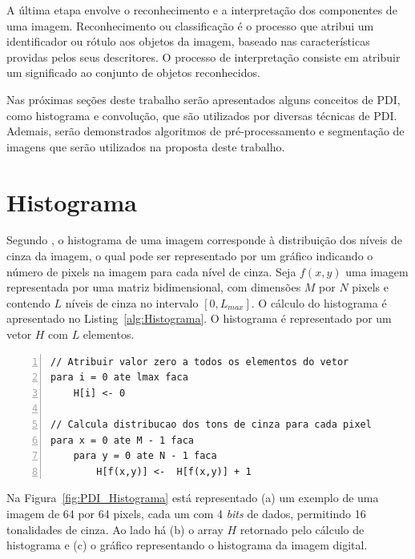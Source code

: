 \documentclass[12pt,oneside,a4paper,english,french,spanish,brazil,]{abntex2}
\begin{document}
A última etapa envolve o reconhecimento e a interpretação dos componentes de uma imagem. Reconhecimento ou classificação é o processo que atribui um identificador ou rótulo aos objetos da imagem, baseado nas características providas pelos seus descritores. O processo de interpretação consiste em atribuir um significado ao conjunto de objetos reconhecidos.

Nas próximas seções deste trabalho serão apresentados alguns conceitos de PDI, como histograma e convolução, que são utilizados por diversas técnicas de PDI. Ademais, serão demonstrados algoritmos de pré-processamento e segmentação de imagens que serão utilizados na proposta deste trabalho.

\section{Histograma}

Segundo \citet{pedrini:2008}, o histograma de uma imagem corresponde à distribuição dos níveis de cinza da imagem, o qual pode ser representado por um gráfico indicando o número de pixels na imagem para cada nível de cinza. Seja \(f(x,y)\) uma imagem representada por uma matriz bidimensional, com dimensões \(M\) por \(N\) pixels e contendo \(L\) níveis de cinza no intervalo \([0, L_{max}]\). O cálculo do histograma é apresentado no Listing~\ref{alg:Histograma}. O histograma é representado por um vetor \(H\) com \(L\) elementos.

\begin{minipage}{\linewidth}
\begin{lstlisting}[caption={Cálculo do histograma de uma imagem em tons de cinza}, label=alg:Histograma, numbers=left]
// Atribuir valor zero a todos os elementos do vetor
para i = 0 ate lmax faca
    H[i] <- 0
    
// Calcula distribucao dos tons de cinza para cada pixel
para x = 0 ate M - 1 faca
    para y = 0 ate N - 1 faca
        H[f(x,y)] <-  H[f(x,y)] + 1
\end{lstlisting}
\end{minipage}

Na Figura~\ref{fig:PDI_Histograma} está representado (a) um exemplo de uma imagem de 64 por 64 pixels, cada um com 4 \textit{bits} de dados, permitindo 16 tonalidades de cinza. Ao lado há (b) o array \(H\) retornado pelo cálculo de histograma e (c) o gráfico representando o histograma da imagem digital.
\end{document}
